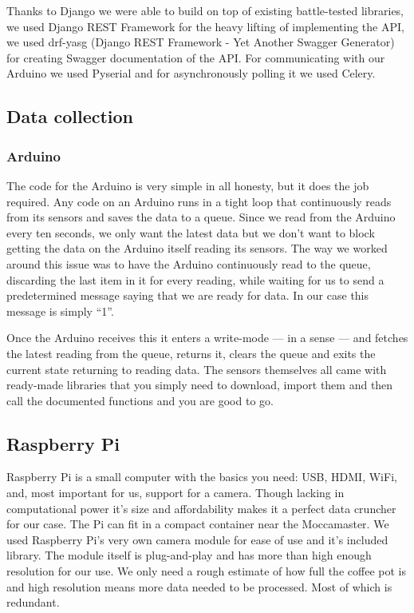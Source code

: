 \documentclass[12pt,a4paper,oneside,article]{memoir}
\numberwithin{equation}{chapter}
\begin{document}
Thanks to Django we were able to build on top of existing battle-tested
libraries, we used Django REST Framework for the heavy lifting of implementing
the API, we used drf-yasg (Django REST Framework - Yet Another Swagger
Generator) for creating Swagger documentation of the API. For communicating with
our Arduino we used Pyserial and for asynchronously polling it we used Celery.

\subsection{Data collection}\label{sec:data-collection}
\subsubsection{Arduino}\label{sec:arduino}
The code for the Arduino is very simple in all honesty, but it does the job
required. Any code on an Arduino runs in a tight loop that continuously reads
from its sensors and saves the data to a queue. Since we read from the Arduino
every ten seconds, we only want the latest data but we don't want to block
getting the data on the Arduino itself reading its sensors. The way we worked
around this issue was to have the Arduino continuously read to the queue,
discarding the last item in it for every reading, while waiting for us to send a
predetermined message saying that we are ready for data. In our case this
message is simply ``1''.

Once the Arduino receives this it enters a write-mode --- in a sense --- and
fetches the latest reading from the queue, returns it, clears the queue and
exits the current state returning to reading data. The sensors themselves all
came with ready-made libraries that you simply need to download, import them and
then call the documented functions and you are good to go.


\subsection{Raspberry Pi}\label{sec:raspberry-pi}
Raspberry Pi is a small computer with the basics you need: USB, HDMI, WiFi, 
and, most important for us, support for a camera. Though lacking in 
computational power it's size and affordability makes it a perfect data 
cruncher for our case. The Pi can fit in a compact container near the 
Moccamaster. We used Raspberry Pi's very own camera module for ease of use and 
it's included library. The module itself is plug-and-play and has more than high 
enough resolution for our use. We only need a rough estimate of how full the 
coffee pot is and high resolution means more data needed to be processed. Most 
of which is redundant. 
\end{document}
